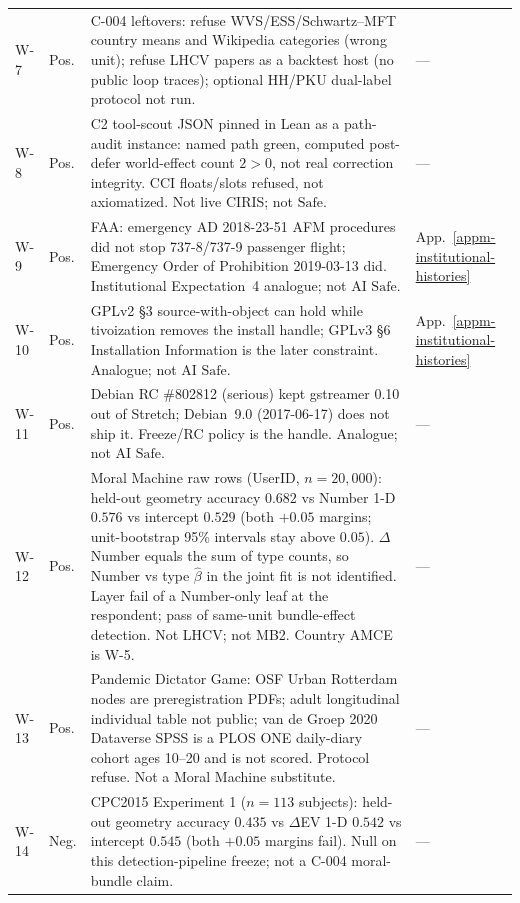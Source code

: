 \begin{longtable}{@{}L{0.05\textwidth}L{0.08\textwidth}L{0.55\textwidth}L{0.255\textwidth}@{}}
\label{finding:w-7}W-7 & Pos. & C-004 leftovers: refuse WVS/ESS/Schwartz--MFT country means and Wikipedia categories (wrong unit); refuse LHCV papers as a backtest host (no public loop traces); optional HH/PKU dual-label protocol not run. & --- \\
\label{finding:w-8}W-8 & Pos. & C2 tool-scout JSON pinned in Lean as a path-audit instance: named path green, computed post-defer world-effect count $2>0$, not real correction integrity. CCI floats/slots refused, not axiomatized. Not live CIRIS; not $\mathrm{Safe}$. & --- \\
\label{finding:w-9}W-9 & Pos. & FAA: emergency AD 2018-23-51 AFM procedures did not stop 737-8/737-9 passenger flight; Emergency Order of Prohibition 2019-03-13 did. Institutional Expectation~4 analogue; not AI $\mathrm{Safe}$. & App.~\ref{appm-institutional-histories} \\
\label{finding:w-10}W-10 & Pos. & GPLv2 \S3 source-with-object can hold while tivoization removes the install handle; GPLv3 \S6 Installation Information is the later constraint. Analogue; not AI $\mathrm{Safe}$. & App.~\ref{appm-institutional-histories} \\
\label{finding:w-11}W-11 & Pos. & Debian RC \#802812 (serious) kept gstreamer 0.10 out of Stretch; Debian~9.0 (2017-06-17) does not ship it. Freeze/RC policy is the handle. Analogue; not AI $\mathrm{Safe}$. & --- \\
\label{finding:w-12}W-12 & Pos. & Moral Machine raw rows (UserID, $n=20{,}000$): held-out geometry accuracy $0.682$ vs Number 1-D $0.576$ vs intercept $0.529$ (both $+0.05$ margins; unit-bootstrap 95\% intervals stay above $0.05$). $\Delta$ Number equals the sum of type counts, so Number vs type $\hat\beta$ in the joint fit is not identified. Layer fail of a Number-only leaf at the respondent; pass of same-unit bundle-effect detection. Not LHCV; not MB2. Country AMCE is W-5. & --- \\
\label{finding:w-13}W-13 & Pos. & Pandemic Dictator Game: OSF Urban Rotterdam nodes are preregistration PDFs; adult longitudinal individual table not public; van de Groep 2020 Dataverse SPSS is a PLOS ONE daily-diary cohort ages 10--20 and is not scored. Protocol refuse. Not a Moral Machine substitute. & --- \\
\label{finding:w-14}W-14 & Neg. & CPC2015 Experiment 1 ($n=113$ subjects): held-out geometry accuracy $0.435$ vs $\Delta$EV 1-D $0.542$ vs intercept $0.545$ (both $+0.05$ margins fail). Null on this detection-pipeline freeze; not a C-004 moral-bundle claim. & --- \\

\end{longtable}
